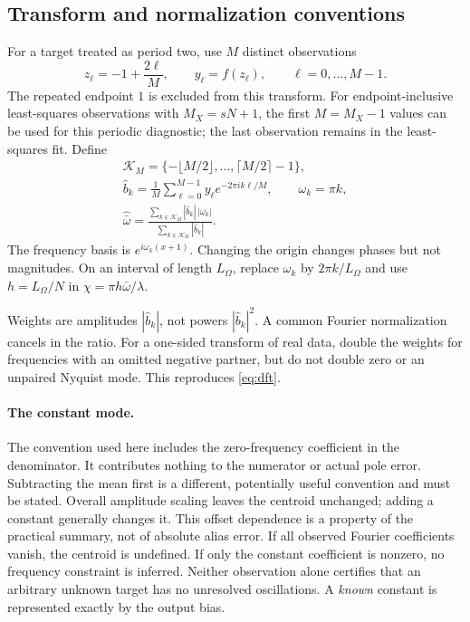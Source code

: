 \documentclass[11pt]{article}
\theoremstyle{definition}\newtheorem{definition}[theorem]{Definition}
\theoremstyle{remark}\newtheorem{remark}[theorem]{Remark}
\numberwithin{equation}{section}
\begin{document}
\subsection{Transform and normalization conventions}
For a target treated as period two, use $M$ distinct observations
\[
 z_\ell=-1+\frac{2\ell}{M},\qquad y_\ell=f(z_\ell),\qquad
 \ell=0,\ldots,M-1.
\]
The repeated endpoint $1$ is excluded from this transform. For endpoint-inclusive least-squares observations with $M_X=sN+1$, the first $M=M_X-1$ values can be used for this periodic diagnostic; the last observation remains in the least-squares fit. Define
\begin{equation}
 \begin{gathered}
 \mathcal K_M=\{-\lfloor M/2\rfloor,\ldots,\lceil M/2\rceil-1\},\\
 \widehat b_k=\frac1M\sum_{\ell=0}^{M-1}y_\ell e^{-2\pi i k\ell/M},
 \qquad \omega_k=\pi k,\\
 \boxed{\widehat{\bar\omega}
 =\frac{\sum_{k\in\mathcal K_M}|\widehat b_k|\,|\omega_k|}
        {\sum_{k\in\mathcal K_M}|\widehat b_k|}.}
 \end{gathered}
 \label{eq:dft}
\end{equation}
The frequency basis is $e^{i\omega_k(x+1)}$. Changing the origin changes phases but not magnitudes. On an interval of length $L_\Omega$, replace $\omega_k$ by $2\pi k/L_\Omega$ and use $h=L_\Omega/N$ in $\chi=\pi h\bar\omega/\lambda$.

Weights are amplitudes $|\widehat b_k|$, not powers $|\widehat b_k|^2$. A common Fourier normalization cancels in the ratio. For a one-sided transform of real data, double the weights for frequencies with an omitted negative partner, but do not double zero or an unpaired Nyquist mode. This reproduces \eqref{eq:dft}.

\paragraph{The constant mode.}
The convention used here includes the zero-frequency coefficient in the denominator. It contributes nothing to the numerator or actual pole error. Subtracting the mean first is a different, potentially useful convention and must be stated. Overall amplitude scaling leaves the centroid unchanged; adding a constant generally changes it. This offset dependence is a property of the practical summary, not of absolute alias error. If all observed Fourier coefficients vanish, the centroid is undefined. If only the constant coefficient is nonzero, no frequency constraint is inferred. Neither observation alone certifies that an arbitrary unknown target has no unresolved oscillations. A \emph{known} constant is represented exactly by the output bias.
\end{document}
